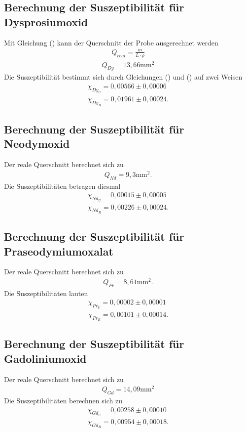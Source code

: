 \subsection{Berechnung der Suszeptibilität für Dysprosiumoxid}
Mit Gleichung () kann der Querschnitt der Probe ausgerechnet werden
\begin{align*}
Q_{real} = \frac{m}{L \cdot \rho}
\end{align*}
\begin{align*}
Q_{Dy} = 13,66 \si{\milli\meter}^2
\end{align*}
Die Suszeptibilität bestimmt sich durch Gleichungen () und () auf zwei Weisen
\begin{align*}
\chi_{Dy_U} = 0,00566 \pm 0,00006 \\
\chi_{Dy_R} = 0,01961 \pm 0,00024 .
\end{align*}

\subsection{Berechnung der Suszeptibilität für Neodymoxid}
Der reale Querschnitt berechnet sich zu
\begin{align*}
Q_{Nd} = 9,3 \si{\milli\meter}^2.
\end{align*}
Die Suszeptibilitäten betragen diesmal
\begin{align*}
\chi_{Nd_U} = 0,00015 \pm 0,00005 \\
\chi_{Nd_R} = 0,00226 \pm 0,00024 .
\end{align*}

\subsection{Berechnung der Suszeptibilität für Praseodymiumoxalat}
Der reale Querschnitt berechnet sich zu
\begin{align*}
Q_{Pr} = 8,61 \si{\milli\meter}^2.
\end{align*}
Die Suszeptibilitäten lauten
\begin{align*}
\chi_{Pr_U} = 0,00002 \pm 0,00001 \\
\chi_{Pr_R} = 0,00101 \pm 0,00014 .
\end{align*}

\subsection{Berechnung der Suszeptibilität für Gadoliniumoxid}
Der reale Querschnitt berechnet sich zu
\begin{align*}
Q_{Gd} = 14,09 \si{\milli\meter}^2
\end{align*}
Die Suszeptibilitäten berechnen sich zu
\begin{align*}
\chi_{Gd_U} = 0,00258 \pm 0,00010 \\
\chi_{Gd_R} = 0,00954 \pm 0,00018 .
\end{align*}



